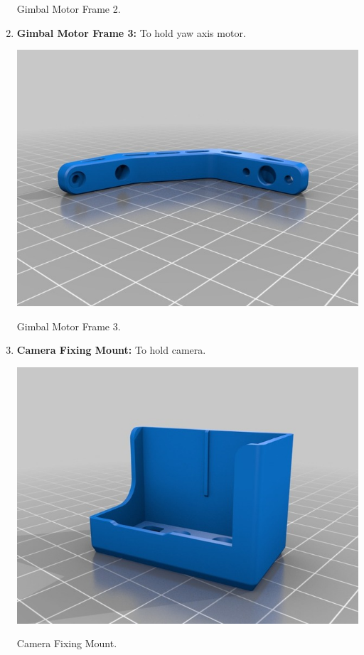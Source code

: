 \documentclass[11pt,a4paper]{article}
\begin{document}
\begin{enumerate}
\begin{center}
			\end{center}
			\begin{center}
				Gimbal Motor Frame 2.
			\end{center}
			\item \textbf{Gimbal Motor Frame 3:} To hold yaw axis motor.
			\begin{center}
				\includegraphics[scale=0.5]{Gimbal_Motor_Frame_3.jpg}
			\end{center}
			\begin{center}
				Gimbal Motor Frame 3.
			\end{center}
			\item \textbf{Camera Fixing Mount:} To hold camera.
			\begin{center}
				\includegraphics[scale=0.5]{Camera_Fixing_Mount.jpg}
			\end{center}
			\begin{center}
				Camera Fixing Mount.
			\end{center}
		\end{enumerate}
\end{document}
